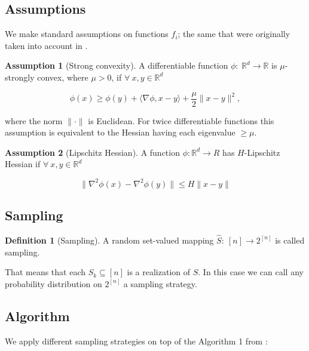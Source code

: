 \documentclass{article}
\theoremstyle{definition}
\newtheorem{definition}{Definition}
\theoremstyle{assumption}
\newtheorem{assumption}{Assumption}
\theoremstyle{lemma}
\theoremstyle{theorem}
\theoremstyle{proposition}
\begin{document}
	\subsection{Assumptions}
	
	We make standard assumptions on functions $f_i$; the same that were originally taken into account in \cite{kovalev2019stochastic}.
	
	
	\begin{assumption}[Strong convexity] A differentiable function $\phi:\ \mathbb R^d \rightarrow \mathbb R$ is $\mu$-strongly convex, where $\mu > 0$, if $\forall\ x, y \in \mathbb R^d$
	
	\begin{equation}\label{strong-conv}
		\phi(x) \geqslant \phi(y) + \langle \nabla \phi, x - y \rangle + \frac{\mu}{2} \| x - y \|^2,
	\end{equation}
	\end{assumption}
	where the norm $\| \cdot \|$ is Euclidean. For twice differentiable functions this assumption is equivalent to the Hessian having each eigenvalue $\geqslant \mu$.
	
	\begin{assumption}[Lipschitz Hessian] A function $\phi: \mathbb R^d \rightarrow R$ has $H$-Lipschitz Hessian if $\forall\ x, y \in \mathbb R^d$
	
	\begin{equation}\label{lip-hess}
		\| \nabla^2 \phi(x) - \nabla^2 \phi(y) \| \leqslant H \| x - y \|
	\end{equation}
	\end{assumption}

	\subsection{Sampling}
	
	\begin{definition}[Sampling]
		A random set-valued mapping $\hat S:\ [n] \rightarrow 2^{[n]}$ is called sampling.
	\end{definition}

	That means that each $S_k \subseteq [n]$ is a realization of $\hat S$. In this case we can call any probability distribution on $2^{[n]}$ a sampling strategy.
	\subsection{Algorithm}
	
	We apply different sampling strategies on top of the Algorithm 1 from \cite{kovalev2019stochastic}:
	
\end{document}
